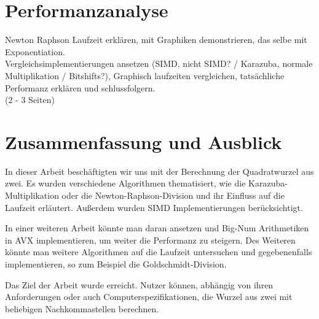 \documentclass[course=erap]{aspdoc}
\begin{document}
\section{Performanzanalyse} \label{sec:performanz}
Newton Raphson Laufzeit erklären, mit Graphiken demonstrieren, das selbe mit Exponentiation. \\
Vergleichsimplementierungen ansetzen (SIMD, nicht SIMD? / Karazuba, normale Multiplikation / Bitshifts?), Graphisch laufzeiten vergleichen, tatsächliche Performanz erklären und schlussfolgern. \\
(2 - 3 Seiten)

\section{Zusammenfassung und Ausblick} \label{sec:zusammenfassung}
In dieser Arbeit beschäftigten wir uns mit der Berechnung der Quadratwurzel aus zwei. Es wurden verschiedene Algorithmen thematisiert, wie die Karazuba-Multiplikation oder die Newton-Raphson-Division und ihr Einfluss auf die Laufzeit erläutert. Außerdem wurden SIMD Implementierungen berücksichtigt. \par
In einer weiteren Arbeit könnte man daran ansetzen und Big-Num Arithmetiken in AVX implementieren, um weiter die Performanz zu steigern. Des Weiteren könnte man weitere Algorithmen auf die Laufzeit untersuchen und gegebenenfalls implementieren, so zum Beispiel die Goldschmidt-Division. \par
Das Ziel der Arbeit wurde erreicht. Nutzer können, abhängig von ihren Anforderungen oder auch Computerspezifikationen, die Wurzel aus zwei mit beliebigen Nachkommastellen berechnen.


{}
\end{document}
